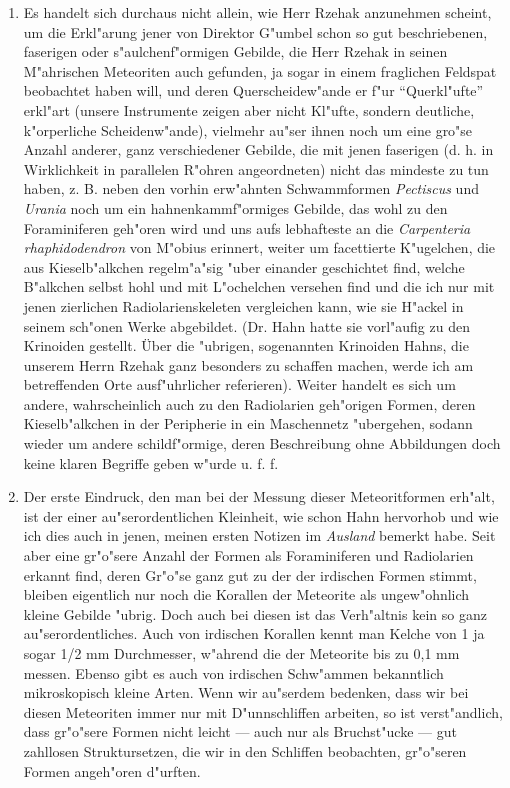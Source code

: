 \documentclass[a4paper, 12pt, oneside]{article}
\begin{document}
\begin{enumerate}
    \item Es handelt sich durchaus nicht allein, wie Herr Rzehak anzunehmen scheint, um die Erkl"arung jener von Direktor G"umbel schon so gut beschriebenen, faserigen oder s"aulchenf"ormigen Gebilde, die Herr Rzehak in seinen M"ahrischen Meteoriten auch gefunden, ja sogar in einem fraglichen Feldspat beobachtet haben will, und deren Querscheidew"ande er f"ur "`Querkl"ufte"' erkl"art (unsere Instrumente zeigen aber nicht Kl"ufte, sondern deutliche, k"orperliche Scheidenw"ande), vielmehr au"ser ihnen noch um eine gro"se Anzahl anderer, ganz verschiedener Gebilde, die mit jenen faserigen (d. h. in Wirklichkeit in parallelen R"ohren angeordneten) nicht das mindeste zu tun haben, z. B. neben den vorhin erw"ahnten Schwammformen \emph{Pectiscus} und \emph{Urania} noch um ein hahnenkammf"ormiges Gebilde, das wohl zu den Foraminiferen geh"oren wird und uns aufs lebhafteste an die \emph{Carpenteria rhaphidodendron} von M"obius erinnert, weiter um facettierte K"ugelchen, die aus Kieselb"alkchen regelm"a"sig "uber einander geschichtet find, welche B"alkchen selbst hohl und mit L"ochelchen versehen find und die ich nur mit jenen zierlichen Radiolarienskeleten vergleichen kann, wie sie H"ackel in seinem sch"onen Werke abgebildet. (Dr. Hahn hatte sie vorl"aufig zu den Krinoiden gestellt. Über die "ubrigen, sogenannten Krinoiden Hahns, die unserem Herrn Rzehak ganz besonders zu schaffen machen, werde ich am betreffenden Orte ausf"uhrlicher referieren). Weiter handelt es sich um andere, wahrscheinlich auch zu den Radiolarien geh"origen Formen, deren Kieselb"alkchen in der Peripherie in ein Maschennetz "ubergehen, sodann wieder um andere schildf"ormige, deren Beschreibung ohne Abbildungen doch keine klaren Begriffe geben w"urde u. f. f.
    \item Der erste Eindruck, den man bei der Messung dieser Meteoritformen erh"alt, ist der einer au"serordentlichen Kleinheit, wie schon Hahn hervorhob und wie ich dies auch in jenen, meinen ersten Notizen im \emph{Ausland} bemerkt habe. Seit aber eine gr"o"sere Anzahl der Formen als Foraminiferen und Radiolarien erkannt find, deren Gr"o"se ganz gut zu der der irdischen Formen stimmt, bleiben eigentlich nur noch die Korallen der Meteorite als ungew"ohnlich kleine Gebilde "ubrig. Doch auch bei diesen ist das Verh"altnis kein so ganz au"serordentliches. Auch von irdischen Korallen kennt man Kelche von 1 ja sogar 1/2 mm Durchmesser, w"ahrend die der Meteorite bis zu 0,1 mm messen. Ebenso gibt es auch von irdischen Schw"ammen bekanntlich mikroskopisch kleine Arten. Wenn wir au"serdem bedenken, dass wir bei diesen Meteoriten immer nur mit D"unnschliffen arbeiten, so ist verst"andlich, dass gr"o"sere Formen nicht leicht --- auch nur als Bruchst"ucke --- gut zahllosen Struktursetzen, die wir in den Schliffen beobachten, gr"o"seren Formen angeh"oren d"urften.

\end{enumerate}
\end{document}
